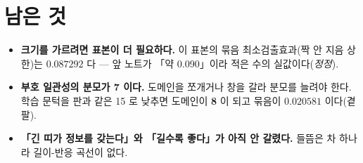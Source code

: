 \documentclass[10pt]{article}
\begin{document}
\section{남은 것}

\begin{itemize}\itemsep2pt
\item \textbf{크기를 가르려면 표본이 더 필요하다.} 이 표본의 묶음 최소검출효과(짝 안 지음 상한)는
      $\mathbf{0.087292}$ 다 --- 앞 노트가 「약 0.090」이라 적은 수의 실값이다(\emph{정정}).
\item \textbf{부호 일관성의 분모가 7 이다.} 도메인을 쪼개거나 창을 갈라 분모를 늘려야 한다.
      학습 문턱을 판과 같은 15 로 낮추면 도메인이 \textbf{8} 이 되고 묶음이 $0.020581$ 이다(곁 팔).
\item \textbf{「긴 띠가 정보를 갖는다」와 「길수록 좋다」가 아직 안 갈렸다.} 들뜸은 차 하나라
      길이-반응 곡선이 없다.
\end{itemize}
\end{document}
